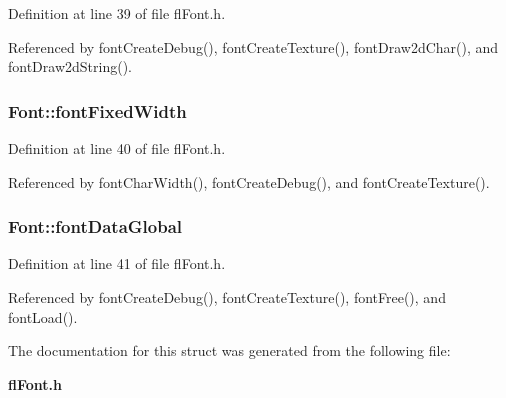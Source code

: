 Definition at line 39 of file fl\-Font.h.

Referenced by font\-Create\-Debug(), font\-Create\-Texture(), font\-Draw2d\-Char(), and font\-Draw2d\-String().
\subsubsection{ {\bf Font::font\-Fixed\-Width}}\label{structFont_dffcc5b90b02a0f906e2a113eee9379c}




Definition at line 40 of file fl\-Font.h.

Referenced by font\-Char\-Width(), font\-Create\-Debug(), and font\-Create\-Texture().
\subsubsection{ {\bf Font::font\-Data\-Global}}\label{structFont_eec1a767d8a36bb0359206993792f83d}




Definition at line 41 of file fl\-Font.h.

Referenced by font\-Create\-Debug(), font\-Create\-Texture(), font\-Free(), and font\-Load().

The documentation for this struct was generated from the following file:\begin{CompactItemize}
\item 
{\bf fl\-Font.h}\end{CompactItemize}
